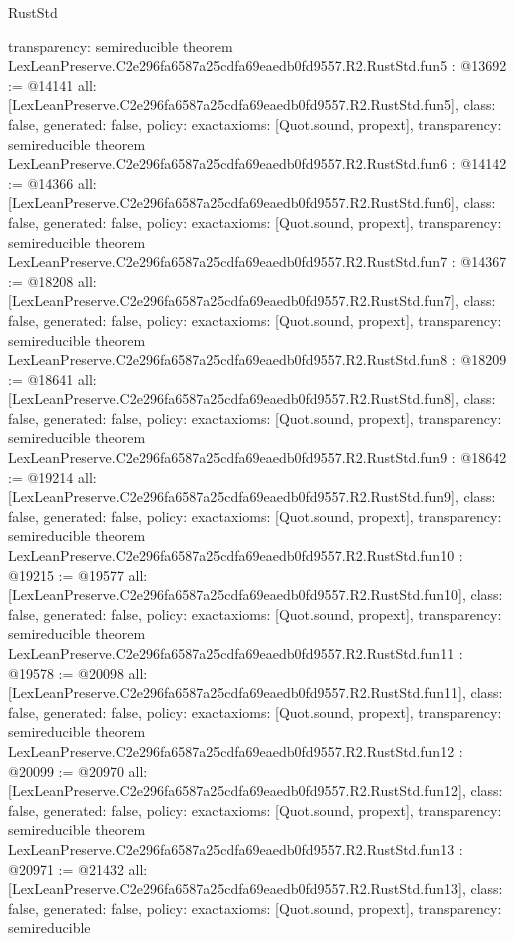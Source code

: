 \begin{lexlean}{RustStd}
\begin{coremodule}
{  transparency: semireducible
}
theorem LexLeanPreserve.C2e296fa6587a25cdfa69eaedb0fd9557.R2.RustStd.fun5 : @13692 := @14141 {
  all: [LexLeanPreserve.C2e296fa6587a25cdfa69eaedb0fd9557.R2.RustStd.fun5],
  class: false,
  generated: false,
  policy: exact{axioms: [Quot.sound, propext]},
  transparency: semireducible
}
theorem LexLeanPreserve.C2e296fa6587a25cdfa69eaedb0fd9557.R2.RustStd.fun6 : @14142 := @14366 {
  all: [LexLeanPreserve.C2e296fa6587a25cdfa69eaedb0fd9557.R2.RustStd.fun6],
  class: false,
  generated: false,
  policy: exact{axioms: [Quot.sound, propext]},
  transparency: semireducible
}
theorem LexLeanPreserve.C2e296fa6587a25cdfa69eaedb0fd9557.R2.RustStd.fun7 : @14367 := @18208 {
  all: [LexLeanPreserve.C2e296fa6587a25cdfa69eaedb0fd9557.R2.RustStd.fun7],
  class: false,
  generated: false,
  policy: exact{axioms: [Quot.sound, propext]},
  transparency: semireducible
}
theorem LexLeanPreserve.C2e296fa6587a25cdfa69eaedb0fd9557.R2.RustStd.fun8 : @18209 := @18641 {
  all: [LexLeanPreserve.C2e296fa6587a25cdfa69eaedb0fd9557.R2.RustStd.fun8],
  class: false,
  generated: false,
  policy: exact{axioms: [Quot.sound, propext]},
  transparency: semireducible
}
theorem LexLeanPreserve.C2e296fa6587a25cdfa69eaedb0fd9557.R2.RustStd.fun9 : @18642 := @19214 {
  all: [LexLeanPreserve.C2e296fa6587a25cdfa69eaedb0fd9557.R2.RustStd.fun9],
  class: false,
  generated: false,
  policy: exact{axioms: [Quot.sound, propext]},
  transparency: semireducible
}
theorem LexLeanPreserve.C2e296fa6587a25cdfa69eaedb0fd9557.R2.RustStd.fun10 : @19215 := @19577 {
  all: [LexLeanPreserve.C2e296fa6587a25cdfa69eaedb0fd9557.R2.RustStd.fun10],
  class: false,
  generated: false,
  policy: exact{axioms: [Quot.sound, propext]},
  transparency: semireducible
}
theorem LexLeanPreserve.C2e296fa6587a25cdfa69eaedb0fd9557.R2.RustStd.fun11 : @19578 := @20098 {
  all: [LexLeanPreserve.C2e296fa6587a25cdfa69eaedb0fd9557.R2.RustStd.fun11],
  class: false,
  generated: false,
  policy: exact{axioms: [Quot.sound, propext]},
  transparency: semireducible
}
theorem LexLeanPreserve.C2e296fa6587a25cdfa69eaedb0fd9557.R2.RustStd.fun12 : @20099 := @20970 {
  all: [LexLeanPreserve.C2e296fa6587a25cdfa69eaedb0fd9557.R2.RustStd.fun12],
  class: false,
  generated: false,
  policy: exact{axioms: [Quot.sound, propext]},
  transparency: semireducible
}
theorem LexLeanPreserve.C2e296fa6587a25cdfa69eaedb0fd9557.R2.RustStd.fun13 : @20971 := @21432 {
  all: [LexLeanPreserve.C2e296fa6587a25cdfa69eaedb0fd9557.R2.RustStd.fun13],
  class: false,
  generated: false,
  policy: exact{axioms: [Quot.sound, propext]},
  transparency: semireducible
}
\end{coremodule}
\end{lexlean}

